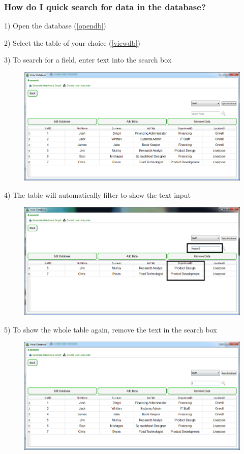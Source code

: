 \subsubsection{How do I quick search for data in the database?}\label{quicksearch}

1) Open the database (\ref{opendb})

2) Select the table of your choice (\ref{viewdb})

3) To search for a field, enter text into the search box 

\begin{figure}[H]
    \includegraphics[width=\textwidth]{./Manual/Images/search1.png}
\end{figure}

4) The table will automatically filter to show the text input

\begin{figure}[H]
    \includegraphics[width=\textwidth]{./Manual/Images/search.png}
\end{figure}

5) To show the whole table again, remove the text in the search box

\begin{figure}[H]
    \includegraphics[width=\textwidth]{./Manual/Images/search2.png}
\end{figure}


